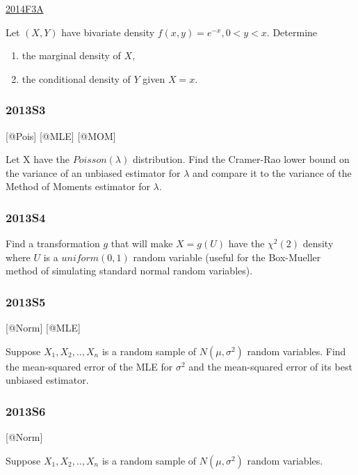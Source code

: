 \documentclass[6pt,Portrait]{article}
\begin{document}
\protect\hyperlink{f3a-1}{2014F3A}

Let \((X,Y)\) have bivariate density \(f(x,y)=e^{-x},0<y<x\). Determine

\begin{enumerate}
\def\labelenumi{(\alph{enumi})}
\item
  the marginal density of \(X\),
\item
  the conditional density of \(Y\) given \(X=x\).
\end{enumerate}

\hypertarget{s3-3}{%
\subsubsection{2013S3}\label{s3-3}}

{[}@Pois{]} {[}@MLE{]} {[}@MOM{]}

Let X have the \(Poisson(\lambda)\) distribution. Find the Cramer-Rao
lower bound on the variance of an unbiased estimator for \(\lambda\) and
compare it to the variance of the Method of Moments estimator for
\(\lambda\).

\hypertarget{s4-3}{%
\subsubsection{2013S4}\label{s4-3}}

Find a transformation \(g\) that will make \(X=g(U)\) have the
\(\chi^2(2)\) density where \(U\) is a \(uniform(0,1)\) random variable
(useful for the Box-Mueller method of simulating standard normal random
variables).

\hypertarget{s5-3}{%
\subsubsection{2013S5}\label{s5-3}}

{[}@Norm{]} {[}@MLE{]}

Suppose \(X_1,X_2,..,X_{n}\) is a random sample of \(N(\mu,\sigma^2)\)
random variables. Find the mean-squared error of the MLE for
\(\sigma^2\) and the mean-squared error of its best unbiased estimator.

\hypertarget{s6-3}{%
\subsubsection{2013S6}\label{s6-3}}

{[}@Norm{]}

Suppose \(X_1,X_2,..,X_{n}\) is a random sample of \(N(\mu,\sigma^2)\)
random variables.
\end{document}

